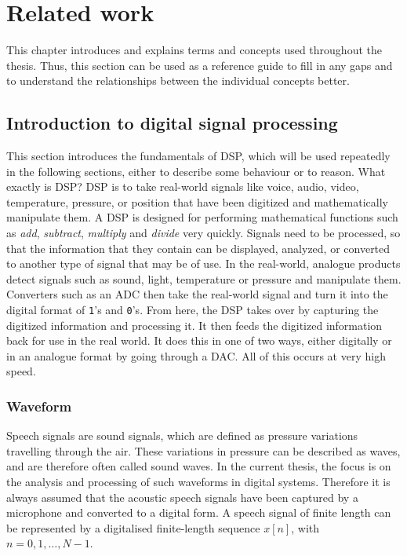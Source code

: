 \chapter{Related work}
\label{ch:Related-Work}
This chapter introduces and explains terms and concepts used throughout the thesis. Thus, this section can be used as a reference guide to fill in any gaps and to understand the relationships between the individual concepts better.

\section{Introduction to digital signal processing}
\label{sec:Intro-DSP}
This section introduces the fundamentals of \gls{DSP}, which will be used repeatedly in the following sections, either to describe some behaviour or to reason. 
\newline
\newline
What exactly is \gls{DSP}? \gls{DSP} is to take real-world signals like voice, audio, video, temperature, pressure, or position that have been digitized and mathematically manipulate them. A \gls{DSP} is designed for performing mathematical functions such as \textit{add}, \textit{subtract}, \textit{multiply} and \textit{divide} very quickly.
\newline
\newline
Signals need to be processed, so that the information that they contain can be displayed, analyzed, or converted to another type of signal that may be of use. In the real-world, analogue products detect signals such as sound, light, temperature or pressure and manipulate them. Converters such as an \gls{ADC} then take the real-world signal and turn it into the digital format of \texttt{1}'s and \texttt{0}'s. From here, the \gls{DSP} takes over by capturing the digitized information and processing it. It then feeds the digitized information back for use in the real world. It does this in one of two ways, either digitally or in an analogue format by going through a \gls{DAC}. All of this occurs at very high speed.\footnotemark
{}

\subsection{Waveform}
\label{sub:Waveform}
Speech signals are sound signals, which are defined as pressure variations travelling through the air. These variations in pressure can be described as waves, and are therefore often called sound waves. In the current thesis, the focus is on the analysis and processing of such waveforms in digital systems. Therefore it is always assumed that the acoustic speech signals have been captured by a microphone and converted to a digital form.
\newline
\newline
A speech signal of finite length can be represented by a digitalised finite-length sequence $x[n]$, with $n = 0, 1, \dots, N-1$.

